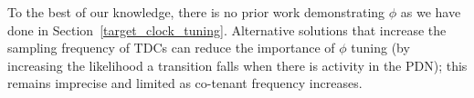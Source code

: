 
To the best of our knowledge, there is no prior work demonstrating $\phi$ as we have done in Section~\ref{target_clock_tuning}. Alternative solutions that increase the sampling frequency of TDCs can reduce the importance of $\phi$ tuning (by increasing the likelihood a transition falls when there is activity in the PDN); this remains imprecise and limited as co-tenant frequency increases.


